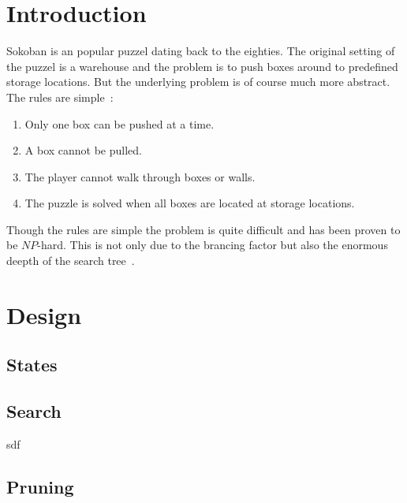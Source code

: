 \documentclass[a4paper,10pt]{article}
\begin{document}
\cleardoublepage
\tableofcontents
\newpage




\section{Introduction}

    Sokoban is an popular puzzel dating back to the eighties.  The original setting of the puzzel is a warehouse and the problem is to push boxes
    around to predefined storage locations.  But the underlying problem is of course much more abstract.  The rules are simple~\cite{wiki_soko}: 
    \begin{enumerate}[I]
        \item  Only one box can be pushed at a time.
        \item A box cannot be pulled.
        \item The player cannot walk through boxes or walls.
        \item The puzzle is solved when all boxes are located at storage locations.
    \end{enumerate}
    Though the rules are simple the problem is quite difficult and has been proven to be $NP$-hard.
    This is not only due to the brancing factor but also the enormous deepth of the search tree~\cite{wiki_soko}.
    
   

\section{Design}

    \subsection{States}
    \subsection{Search}
        sdf~\cite{solving_soko}
    \subsection{Pruning}
\end{document}
